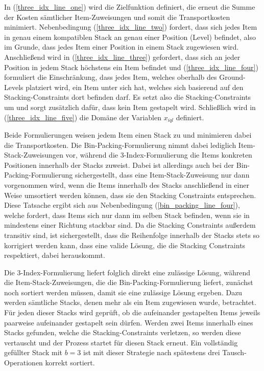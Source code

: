 In (\ref{three_idx_line_one}) wird die Zielfunktion definiert, die erneut die Summe der Kosten sämtlicher Item-Zuweisungen
und somit die Transportkosten minimiert.
Nebenbedingung (\ref{three_idx_line_two}) fordert, dass sich jedes Item in genau einem kompatiblen Stack an genau
einer Position (Level) befindet,
also im Grunde, dass jedes Item einer Position in einem Stack zugewiesen wird.
Anschließend wird in (\ref{three_idx_line_three}) gefordert, dass sich an jeder Position in jedem Stack höchstens ein Item befindet und
(\ref{three_idx_line_four}) formuliert die Einschränkung, dass jedes Item, welches oberhalb des Ground-Levels platziert wird,
ein Item unter sich hat, welches sich basierend auf den Stacking-Constraints dort befinden darf.
Es setzt also die Stacking-Constraints um und sorgt zusätzlich dafür, dass kein Item  gestapelt wird.
Schließlich wird in (\ref{three_idx_line_five}) die Domäne der Variablen $x_{iql}$ definiert.

Beide Formulierungen weisen jedem Item einen Stack zu und minimieren dabei die Transportkosten.
Die Bin-Packing-Formulierung nimmt dabei lediglich Item-Stack-Zuweisungen vor, während die 3-Index-Formulierung die
Items konkreten Positionen innerhalb der Stacks zuweist. Dabei ist allerdings auch bei der Bin-Packing-Formulierung
sichergestellt, dass eine Item-Stack-Zuweisung nur dann vorgenommen wird, wenn die Items innerhalb des Stacks anschließend
in einer Weise umsortiert werden können, dass sie den Stacking Constraints entsprechen. Diese Tatsache ergibt sich aus Nebenbedingung (\ref{bin_packing_line_four}), welche fordert, dass Items sich nur dann im selben Stack befinden, wenn sie in mindestens einer Richtung stackbar sind.
Da die Stacking Constraints außerdem transitiv sind, ist sichergestellt, dass die Reihenfolge innerhalb der Stacks stets so korrigiert werden kann, dass eine valide Lösung, die die Stacking Constraints respektiert, dabei herauskommt.

Die 3-Index-Formulierung liefert folglich direkt eine zulässige Lösung, während die Item-Stack-Zuweisungen, die die Bin-Packing-Formulierung liefert, zunächst noch sortiert werden müssen, damit sie eine zulässige Lösung ergeben.
Dazu werden sämtliche Stacks, denen mehr als ein Item zugewiesen wurde, betrachtet. Für jeden
dieser Stacks wird geprüft, ob die aufeinander gestapelten Items jeweils paarweise aufeinander gestapelt sein dürfen.
Werden zwei Items innerhalb eines Stacks gefunden, welche die Stacking-Constraints verletzen, so werden diese
vertauscht und der Prozess startet für diesen Stack erneut. Ein vollständig gefüllter Stack mit $b = 3$ ist mit dieser
Strategie nach spätestens drei Tausch-Operationen korrekt sortiert.

